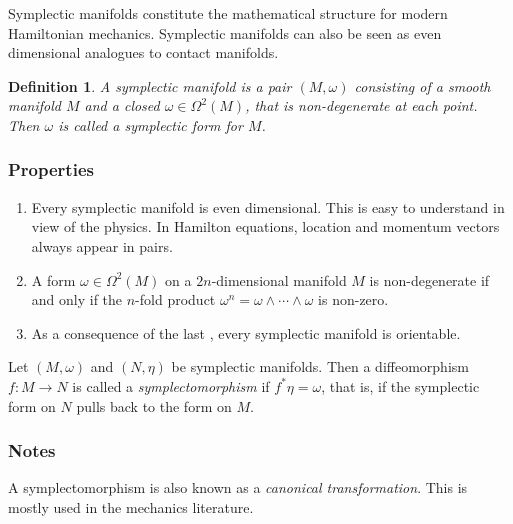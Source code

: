 \documentclass[12pt]{article}
\newtheorem{defn}{Definition}
\begin{document}
Symplectic manifolds constitute
the mathematical structure for modern Hamiltonian mechanics.
Symplectic manifolds can also be seen as even dimensional 
analogues to contact manifolds. 

\begin{defn}
A {\em symplectic manifold} is a pair $(M,\omega)$ consisting 
of a smooth manifold $M$ and a 
closed  
$\omega\in\Omega^2(M)$, that is non-degenerate
at each point.  
Then $\omega$ is called a {\em symplectic 
form} for $M$.
\end{defn}

\subsubsection*{Properties}
\begin{enumerate}
\item Every symplectic manifold is even dimensional. This is 
easy to understand in view of the physics. In Hamilton
equations, location and momentum vectors always appear in pairs.
\item A form $\omega\in \Omega^2(M)$ on a $2n$-dimensional 
manifold $M$ is non-degenerate if and only if the 
$n$-fold product $\omega^n= \omega\wedge \cdots \wedge \omega$
is non-zero.
\item As a consequence of the last , every symplectic manifold
is orientable. 
\end{enumerate}

Let $(M,\omega)$ and $(N,\eta)$ be symplectic manifolds.  Then a diffeomorphism $f\colon M\to N$ is
called a {\em symplectomorphism} if $f^*\eta=\omega$, that is, if the symplectic form on $N$
pulls back to the form on $M$.

\subsubsection*{Notes}
A symplectomorphism is also known as a \emph{canonical transformation}.
This  is mostly used in the mechanics literature.
\end{document}
